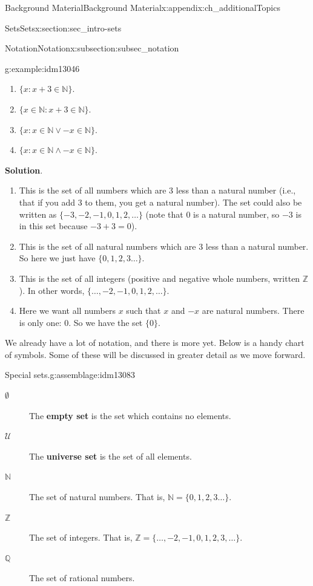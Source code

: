 \documentclass[oneside,10pt,]{book}
\newcommand{\terminology}[1]{\textbf{#1}}
\numberwithin{equation}{chapter}
\def\N{\mathbb N}
\def\Z{\mathbb Z}
\def\Q{\mathbb Q}
\def\U{\mathcal U}
\def\st{:}
\begin{document}
\begin{appendixptx}{Background Material}{}{Background Material}{}{}{x:appendix:ch_additionalTopics}
\begin{sectionptx}{Sets}{}{Sets}{}{}{x:section:sec_intro-sets}
\begin{subsectionptx}{Notation}{}{Notation}{}{}{x:subsection:subsec_notation}
\begin{example}{}{g:example:idm13046}
\begin{enumerate}
\item{}\(\{x \st x + 3 \in \N\}\).%
\item{}\(\{x \in \N \st x + 3 \in \N\}\).%
\item{}\(\{x \st x \in \N \vee -x \in \N\}\).%
\item{}\(\{x \st x \in \N \wedge -x \in \N\}\).%
\end{enumerate}
%
\par\smallskip%
\noindent\textbf{Solution}.\hypertarget{g:solution:idm13059}{}\quad{}%
\begin{enumerate}
\item{}This is the set of all numbers which are 3 less than a natural number (i.e., that if you add 3 to them, you get a natural number). The set could also be written as \(\{-3, -2, -1, 0, 1, 2, \ldots\}\) (note that 0 is a natural number, so \(-3\) is in this set because \(-3 + 3 = 0\)).%
\item{}This is the set of all natural numbers which are 3 less than a natural number. So here we just have \(\{0, 1, 2,3 \ldots\}\).%
\item{}This is the set of all integers  (positive and negative whole numbers, written \(\Z\)). In other words, \(\{\ldots, -2, -1, 0, 1, 2, \ldots\}\).%
\item{}Here we want all numbers \(x\) such that \(x\) and \(-x\) are natural numbers. There is only one: 0. So we have the set \(\{0\}\).%
\end{enumerate}
%
\end{example}
We already have a lot of notation, and there is more yet. Below is a handy chart of symbols. Some of these will be discussed in greater detail as we move forward.%
\begin{assemblage}{Special sets.}{g:assemblage:idm13083}%
%
\begin{description}
\item[{\(\emptyset\)}]The \terminology{empty set} is the set which contains no elements. \label{g:notation:idm13092}  %
\item[{\(\U\)}]The \terminology{universe set} is the set of all elements. \label{g:notation:idm13102}%
\item[{\(\N\)}]The set of natural numbers. That is, \(\N =
\{0, 1, 2, 3\ldots\}\).\label{g:notation:idm13110} %
\item[{\(\Z\)}]The set of integers. That is, \(\Z = \{\ldots, -2, -1, 0, 1, 2, 3, \ldots\}\).  \label{g:notation:idm13122}%
\item[{\(\Q\)}]The set of rational numbers.  \label{g:notation:idm13129} %

\end{description}
\end{assemblage}
\end{subsectionptx}
\end{sectionptx}
\end{appendixptx}
\end{document}
